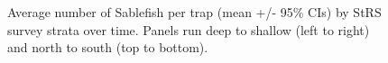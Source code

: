 \documentclass[12pt]{article}\usepackage[]{graphicx}\usepackage[]{color}
\begin{document}
\begin{figure}[htb]

{\centering {} 

}

\caption{Average number of Sablefish per trap (mean +/- 95\% CIs) by StRS survey strata over time. Panels run deep to shallow (left to right) and north to south (top to bottom).}\label{fig:figure8}
\end{figure}
\clearpage
\end{document}
